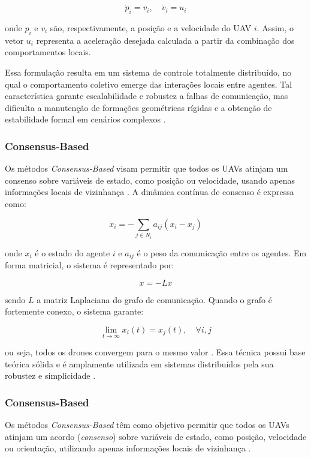 \documentclass[portuguese]{sbcreviews-2025}%
\begin{document}
\[
\dot{p}_i = v_i, \quad \dot{v}_i = u_i
\]

onde $p_i$ e $v_i$ são, respectivamente, a posição e a velocidade do UAV $i$. Assim, o vetor $u_i$ representa a aceleração desejada calculada a partir da combinação dos comportamentos locais.

Essa formulação resulta em um sistema de controle totalmente distribuído, no qual o comportamento coletivo emerge das interações locais entre agentes. Tal característica garante escalabilidade e robustez a falhas de comunicação, mas dificulta a manutenção de formações geométricas rígidas e a obtenção de estabilidade formal em cenários complexos \cite{bu2024advancement, ouyang2023formation}.



\subsubsection{Consensus-Based}

Os métodos \textit{Consensus-Based} visam permitir que todos os UAVs atinjam um consenso sobre variáveis de estado, como posição ou velocidade, usando apenas informações locais de vizinhança \cite{bu2024advancement, ouyang2023formation}. A dinâmica contínua de consenso é expressa como:

\[
\dot{x}_i = -\sum_{j \in N_i} a_{ij}(x_i - x_j)
\]

onde $x_i$ é o estado do agente $i$ e $a_{ij}$ é o peso da comunicação entre os agentes. Em forma matricial, o sistema é representado por:

\[
\dot{x} = -Lx
\]

sendo $L$ a matriz Laplaciana do grafo de comunicação. Quando o grafo é fortemente conexo, o sistema garante:

\[
\lim_{t \to \infty} x_i(t) = x_j(t), \quad \forall i, j
\]

ou seja, todos os drones convergem para o mesmo valor \cite{ouyang2023formation}. Essa técnica possui base teórica sólida e é amplamente utilizada em sistemas distribuídos pela sua robustez e simplicidade \cite{bu2024advancement}.

\subsubsection{Consensus-Based}

Os métodos \textit{Consensus-Based} têm como objetivo permitir que todos os UAVs atinjam um acordo (\textit{consenso}) sobre variáveis de estado, como posição, velocidade ou orientação, utilizando apenas informações locais de vizinhança \cite{bu2024advancement, ouyang2023formation, olfati2007consensus, ren2008distributed}. 
\end{document}
